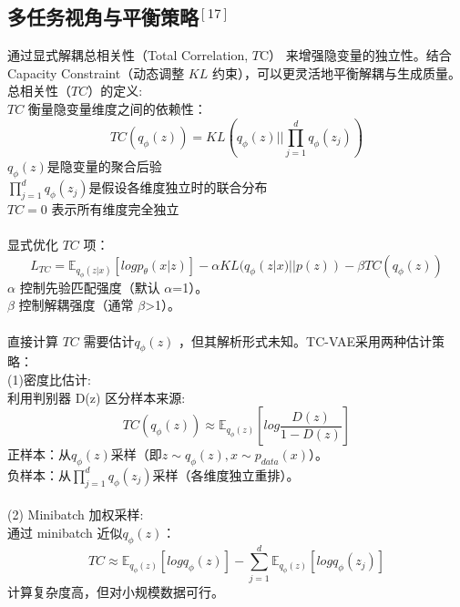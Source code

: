 \documentclass[final]{ws-ijseke}
\begin{document}
\subsection{多任务视角与平衡策略$^{[17]}$}
\hspace*{2em} 通过显式解耦总相关性（Total Correlation, $T$C） 来增强隐变量的独立性。结合 Capacity Constraint（动态调整 $KL$ 约束），可以更灵活地平衡解耦与生成质量。\\
总相关性（$TC$）的定义:\\
$TC$ 衡量隐变量维度之间的依赖性：
\begin{equation*}
    TC(q_\phi(z)) = KL(q_\phi(z)||\prod_{j=1}^d q_\phi(z_j))
\end{equation*}
$q_\phi(z)$是隐变量的聚合后验\\
$\prod_{j=1}^d q_\phi(z_j)$是假设各维度独立时的联合分布\\
$TC = 0$ 表示所有维度完全独立\\\\
显式优化 $TC$ 项：
\begin{equation*}
    L_{TC} = \mathbb{E}_{q_\phi(z|x)}[logp_\theta(x|z)] - \alpha KL(q_\phi(z|x)||p(z))-\beta TC(q_\phi(z))
\end{equation*}
$\alpha$ 控制先验匹配强度（默认 $\alpha$=1）。\\
$\beta$ 控制解耦强度（通常 $\beta$>1）。\\\\
\hspace*{2em} 直接计算 $TC$ 需要估计$q_\phi(z)$ ，但其解析形式未知。TC-VAE采用两种估计策略：\\
(1)密度比估计:\\
利用判别器 D(z) 区分样本来源:
\begin{equation*}
    TC(q_\phi(z)) \approx \mathbb{E}_{q_\phi(z)}[log\frac{D(z)}{1-D(z)}]
\end{equation*}
正样本：从$q_\phi(z)$采样（即$z \sim q_\phi(z), x\sim p_{data}(x)$）。\\
负样本：从$\prod_{j=1}^dq_\phi(z_j)$采样（各维度独立重排）。\\\\
(2) Minibatch 加权采样:\\
通过 minibatch 近似$q_\phi(z)$：
\begin{equation*}
    TC \approx \mathbb{E}_{q_\phi(z)}[logq_\phi(z)] - \sum_{j=1}^d\mathbb{E}_{q_\phi(z)}[logq_\phi(z_j)]
\end{equation*}
计算复杂度高，但对小规模数据可行。\\\\
\end{document}
